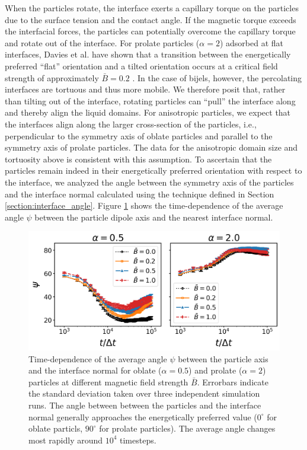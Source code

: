 When the particles rotate, the interface exerts a capillary torque on
the particles due to the surface tension and the contact angle. If the
magnetic torque exceeds the interfacial forces, the particles can
potentially overcome the capillary torque and rotate out of the
interface. For prolate particles (\(\alpha=2\)) adsorbed at flat
interfaces, Davies et al. have shown that a transition between the
energetically preferred ``flat'' orientation and a tilted orientation
occurs at a critical field strength of approximately \(\bar{B}=0.2\)
\cite{bresme_orientational_2007,davies_interface_2014,newton_influence_2014}.
In the case of bijels, however, the percolating interfaces are tortuous
and thus more mobile. We therefore posit that, rather than tilting out
of the interface, rotating particles can ``pull'' the interface along
and thereby align the liquid domains. For anisotropic particles, we
expect that the interfaces align along the larger cross-section of the
particles, i.e., perpendicular to the symmetry axis of oblate particles
and parallel to the symmetry axis of prolate particles. The data for the
anisotropic domain size and tortuosity above is consistent with this
assumption. To ascertain that the particles remain indeed in their
energetically preferred orientation with respect to the interface, we
analyzed the angle between the symmetry axis of the particles and the
interface normal calculated using the technique defined in Section 
\ref{section:interface_angle}. Figure \ref{fig:psi_time} shows the time-dependence of the average angle
\(\psi\) between the particle dipole axis and the nearest interface normal.

\begin{figure}
\centering
\includegraphics[width=\columnwidth]{figures/results/paper1/psi-vs-t.png}
\caption{Time-dependence of the average angle $\psi$ between the particle axis and the 
        interface normal for oblate ($\alpha=0.5$) and prolate ($\alpha=2$) particles at different 
        magnetic field strength $\bar{B}$. Errorbars indicate the standard deviation taken over three 
        independent simulation runs. The angle between between the particles and the interface normal generally 
        approaches the energetically preferred value ($0^\circ$ for oblate particls, $90^\circ$ for prolate particles).
        The average angle changes most rapidly around $10^4$ timesteps.}
\label{fig:psi_time}
\end{figure}

